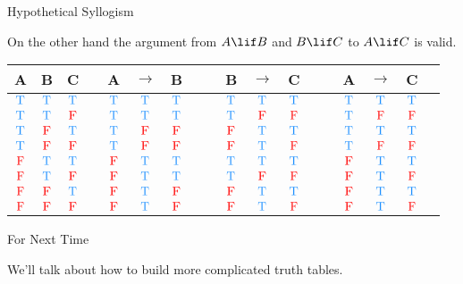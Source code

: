\documentclass[
  ignorenonframetext,
]{beamer}
\renewcommand{\,}{\text{, }}
\def\True{\textcolor{dodgerblue}{\text{T}}}
\def\False{\textcolor{red}{\text{F}}}
\begin{document}
\begin{frame}{Hypothetical Syllogism}
\protect\hypertarget{hypothetical-syllogism}{}

On the other hand the argument from \(A \lif B\) and \(B \lif C\) to
\(A \lif C\) is valid.

\begin{center}
\bigskip
\begin{tabular}{@{ }c@{ }@{ }c@{ }@{ }c | c@{ }@{ }c@{ }@{ }c@{ }@{ }c@{ }@{ }c | c@{ }@{ }c@{ }@{ }c@{ }@{ }c@{ }@{ }c | c@{ }@{ }c@{ }@{ }c@{ }@{ }c@{ }@{ }c}
A & B & C &  & A & $\rightarrow$ & B &  &  & B & $\rightarrow$ & C &  &  & A & $\rightarrow$ & C & \\
\hline 
$\True$ & $\True$ & $\True$ &  & $\True$ & \textcolor{red}{$\True$} & $\True$ &  &  & $\True$ & \textcolor{red}{$\True$} & $\True$ &  &  & $\True$ & \textcolor{red}{$\True$} & $\True$ & \\
$\True$ & $\True$ & $\False$ &  & $\True$ & \textcolor{red}{$\True$} & $\True$ &  &  & $\True$ & \textcolor{red}{$\False$} & $\False$ &  &  & $\True$ & \textcolor{red}{$\False$} & $\False$ & \\
$\True$ & $\False$ & $\True$ &  & $\True$ & \textcolor{red}{$\False$} & $\False$ &  &  & $\False$ & \textcolor{red}{$\True$} & $\True$ &  &  & $\True$ & \textcolor{red}{$\True$} & $\True$ & \\
$\True$ & $\False$ & $\False$ &  & $\True$ & \textcolor{red}{$\False$} & $\False$ &  &  & $\False$ & \textcolor{red}{$\True$} & $\False$ &  &  & $\True$ & \textcolor{red}{$\False$} & $\False$ & \\
$\False$ & $\True$ & $\True$ &  & $\False$ & \textcolor{red}{$\True$} & $\True$ &  &  & $\True$ & \textcolor{red}{$\True$} & $\True$ &  &  & $\False$ & \textcolor{red}{$\True$} & $\True$ & \\
$\False$ & $\True$ & $\False$ &  & $\False$ & \textcolor{red}{$\True$} & $\True$ &  &  & $\True$ & \textcolor{red}{$\False$} & $\False$ &  &  & $\False$ & \textcolor{red}{$\True$} & $\False$ & \\
$\False$ & $\False$ & $\True$ &  & $\False$ & \textcolor{red}{$\True$} & $\False$ &  &  & $\False$ & \textcolor{red}{$\True$} & $\True$ &  &  & $\False$ & \textcolor{red}{$\True$} & $\True$ & \\
$\False$ & $\False$ & $\False$ &  & $\False$ & \textcolor{red}{$\True$} & $\False$ &  &  & $\False$ & \textcolor{red}{$\True$} & $\False$ &  &  & $\False$ & \textcolor{red}{$\True$} & $\False$ & \\
\end{tabular}
\end{center}

\end{frame}

\begin{frame}{For Next Time}
\protect\hypertarget{for-next-time}{}

We'll talk about how to build more complicated truth tables.

\end{frame}
\end{document}
